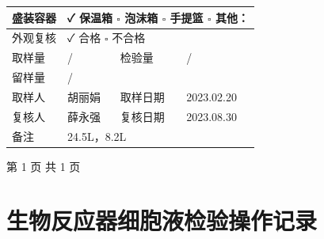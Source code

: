 \documentclass[UTF8,10pt,a4paper,fontset=fandol]{ctexart}
\newcommand{\fieldvalue}[1]{#1}
\newcommand{\handwritten}[1]{#1}
\begin{document}
\begin{center}
\begin{tabularx}{0.92\textwidth}{|p{2.2cm}|X|p{2.2cm}|X|}
\hline
\multicolumn{1}{|c|}{盛装容器} &
\multicolumn{3}{l|}{
\fieldvalue{\handwritten{✓ 保温箱}}
\quad $\square$ 泡沫箱
\quad $\square$ 手提篮
\quad $\square$ 其他：\underline{\hspace{1.5cm}}}\\
\hline
\multicolumn{1}{|c|}{外观复核} &
\multicolumn{3}{l|}{
\fieldvalue{\handwritten{✓ 合格}}
\quad $\square$ 不合格}\\
\hline
取样量 &
\fieldvalue{\handwritten{/}} &
检验量 &
\fieldvalue{\handwritten{/}}\\
\hline
留样量 &
\fieldvalue{\handwritten{/}} &
\multicolumn{2}{c|}{}\\
\hline
取样人 &
\fieldvalue{\handwritten{胡丽娟}} &
取样日期 &
\fieldvalue{\handwritten{2023.02.20}}\\
\hline
复核人 &
\fieldvalue{\handwritten{薛永强}} &
复核日期 &
\fieldvalue{\handwritten{2023.08.30}}\\
\hline
备注 &
\multicolumn{3}{l|}{
\fieldvalue{\handwritten{24.5L，8.2L}}}\\
\hline
\end{tabularx}

\vspace{1cm}
第 1 页 共 1 页
\end{center}

\newpage

\section*{生物反应器细胞液检验操作记录}
\end{document}

